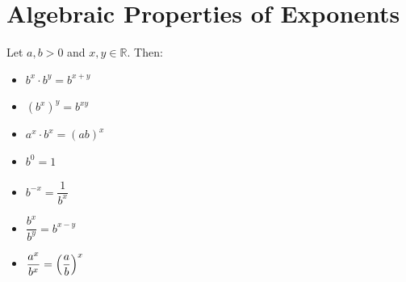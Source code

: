 \section{Algebraic Properties of Exponents}
Let \(a, b > 0\) and \(x, y \in \mathbb{R}\). Then:
\begin{itemize}
  \item \(b^x \cdot b^y = b^{x+y}\)
  \item \((b^x)^y = b^{xy}\)
  \item \(a^x \cdot b^x = (ab)^x\)
  \item \(b^0 = 1\)
  \item \(b^{-x} = \dfrac{1}{b^x}\)
  \item \(\dfrac{b^x}{b^y} = b^{x-y}\)
  \item \(\dfrac{a^x}{b^x} = \Bigl(\dfrac{a}{b}\Bigr)^x\)
\end{itemize}

